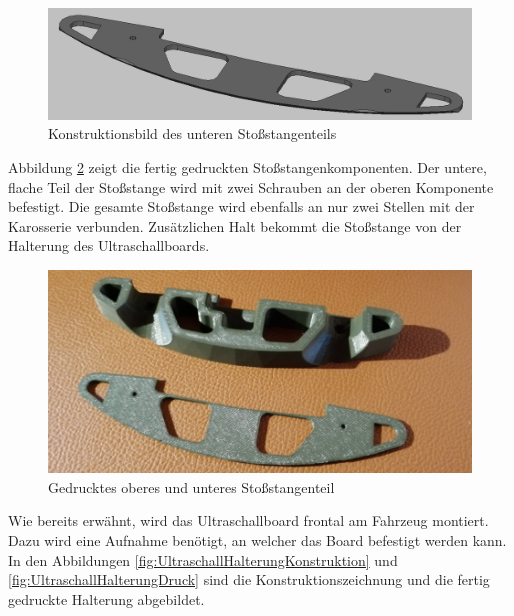 \begin{figure}[H] %
\includegraphics[width=.8\textwidth]{sec2/images/3DAnbaukomponenten/Konstruktionsbilder/StossstangeKonstruktion02} 
\centering
\captionsetup{width=.95\textwidth}
\caption[Konstruktionsbild des unteren Stoßstangenteils]{Konstruktionsbild des unteren Stoßstangenteils}\centering
\label{fig:StossstangeKonstruktion02}
\end{figure}

Abbildung \ref{fig:StossstangeDruck} zeigt die fertig gedruckten Stoßstangenkomponenten. Der untere, flache Teil der Stoßstange wird mit zwei Schrauben an der oberen Komponente befestigt. Die gesamte Stoßstange wird ebenfalls an nur zwei Stellen mit der Karosserie verbunden. Zusätzlichen Halt bekommt die Stoßstange von der Halterung des Ultraschallboards.

\begin{figure}[H] %
\includegraphics[width=.7\textwidth]{sec2/images/3DAnbaukomponenten/Druckbilder/StossstangeDruck} 
\centering
\captionsetup{width=.95\textwidth}
\caption[Gedrucktes oberes und unteres Stoßstangenteil]{Gedrucktes oberes und unteres Stoßstangenteil}\centering
\label{fig:StossstangeDruck}
\end{figure}


Wie bereits erwähnt, wird das Ultraschallboard frontal am Fahrzeug montiert. Dazu wird eine Aufnahme benötigt, an welcher das Board befestigt werden kann. In den Abbildungen \ref{fig:UltraschallHalterungKonstruktion} und \ref{fig:UltraschallHalterungDruck} sind die Konstruktionszeichnung und die fertig gedruckte Halterung abgebildet.

